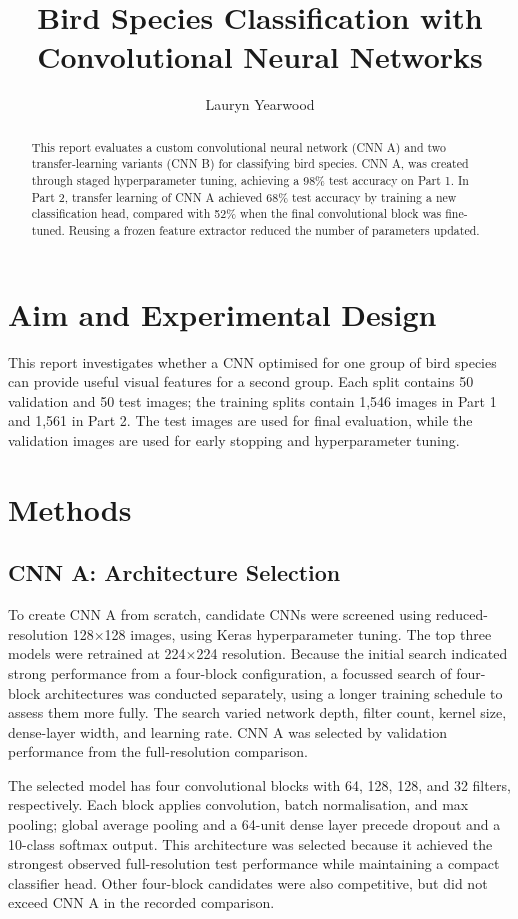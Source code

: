 \documentclass[11pt,a4paper]{article}
\title{Bird Species Classification with Convolutional Neural Networks}
\author{Lauryn Yearwood}
\date{}
\begin{document}
\maketitle
\vspace{-2.2em}

\begin{abstract}
This report evaluates a custom convolutional neural network (CNN A) and two
transfer-learning variants (CNN B) for classifying bird species. CNN A, was created through 
staged hyperparameter tuning, achieving a 98\% test accuracy on Part 1. In Part 2,
transfer learning of CNN A achieved 68\% test accuracy by training a new classification head,
compared with 52\% when the final convolutional block was fine-tuned. Reusing a frozen feature 
extractor reduced the number of parameters updated.
\end{abstract}

\section{Aim and Experimental Design}
This report investigates whether a CNN optimised for one group of bird species can provide
useful visual features for a second group. Each split contains 50 validation and 50 test images;
the training splits contain 1,546 images in Part 1 and 1,561 in Part 2. The test images are used 
for final evaluation, while the validation images are used for early stopping and hyperparameter tuning. 

\section{Methods}
\subsection{CNN A: Architecture Selection}
To create CNN A from scratch, candidate CNNs were screened using reduced-resolution 
128$\times$128 images, using Keras hyperparameter tuning. The top three models were
retrained at 224$\times$224 resolution. Because the initial search indicated strong performance 
from a four-block configuration, a focussed search of four-block architectures was conducted 
separately, using a longer training schedule to assess them more fully. The search varied 
network depth, filter count, kernel size, dense-layer width, and learning rate. 
CNN A was selected by validation performance from the full-resolution comparison.

The selected model has four convolutional blocks with 64, 128, 128, and 32
filters, respectively. Each block applies convolution, batch normalisation, and max
pooling; global average pooling and a 64-unit dense layer precede dropout and a 10-class
softmax output. This architecture was selected because it achieved the strongest
observed full-resolution test performance while maintaining a compact classifier head. Other
four-block candidates were also competitive, but did not exceed CNN A in the recorded
comparison.
\end{document}
